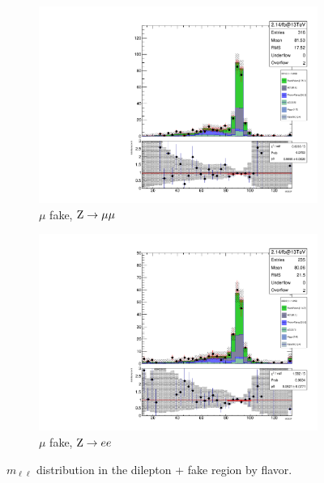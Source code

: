 \begin{figure}
\begin{center}
\begin{subfigure}[b]{.5\textwidth}
		\includegraphics[width=\textwidth]{Background/bkg_fakeLight/Z_3mu_MOSSF}
		\caption{$\mu$ fake, $\mathrm{Z} \to \mu\mu$}
	\end{subfigure}%
	\begin{subfigure}[b]{.5\textwidth}
		\includegraphics[width=\textwidth]{Background/bkg_fakeLight/Z_2el1mu_MOSSF}
		\caption{$\mu$ fake, $\mathrm{Z} \to e e$}
	\end{subfigure}%
	\caption{$m_{\ell\ell}$ distribution in the dilepton + fake region by flavor.
	\label{fig:fakeLight_Z_MOSSF_byFlavor}}
\end{center}
\end{figure}

